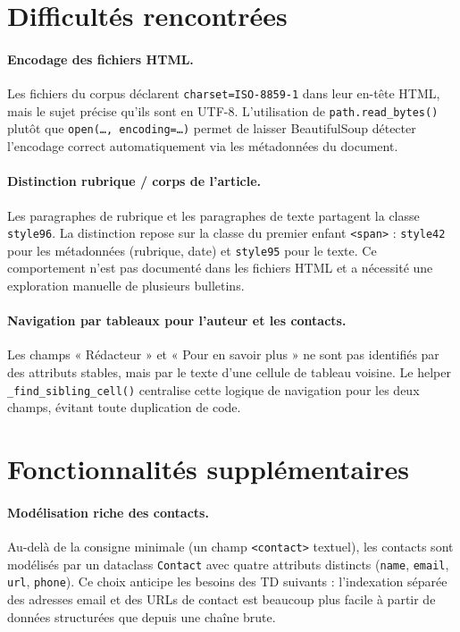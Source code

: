 \section{Difficultés rencontrées}

\paragraph{Encodage des fichiers HTML.}
Les fichiers du corpus déclarent \texttt{charset=ISO-8859-1} dans leur en-tête HTML,
mais le sujet précise qu'ils sont en UTF-8. L'utilisation de \texttt{path.read\_bytes()}
plutôt que \texttt{open(\ldots, encoding=\ldots)} permet de laisser BeautifulSoup détecter
l'encodage correct automatiquement via les métadonnées du document.

\paragraph{Distinction rubrique / corps de l'article.}
Les paragraphes de rubrique et les paragraphes de texte partagent la classe \texttt{style96}.
La distinction repose sur la classe du premier enfant \texttt{<span>} : \texttt{style42}
pour les métadonnées (rubrique, date) et \texttt{style95} pour le texte. Ce comportement
n'est pas documenté dans les fichiers HTML et a nécessité une exploration manuelle de
plusieurs bulletins.

\paragraph{Navigation par tableaux pour l'auteur et les contacts.}
Les champs « Rédacteur » et « Pour en savoir plus » ne sont pas identifiés par des
attributs stables, mais par le texte d'une cellule de tableau voisine. Le helper
\texttt{\_find\_sibling\_cell()} centralise cette logique de navigation pour les deux
champs, évitant toute duplication de code.

\section{Fonctionnalités supplémentaires}

\paragraph{Modélisation riche des contacts.}
Au-delà de la consigne minimale (un champ \texttt{<contact>} textuel), les contacts
sont modélisés par un dataclass \texttt{Contact} avec quatre attributs distincts
(\texttt{name}, \texttt{email}, \texttt{url}, \texttt{phone}). Ce choix anticipe les
besoins des TD suivants : l'indexation séparée des adresses email et des URLs de contact
est beaucoup plus facile à partir de données structurées que depuis une chaîne brute.

